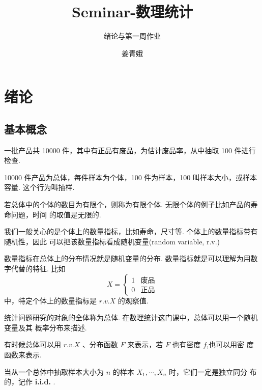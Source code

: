 \documentclass[openany]{book}
\title{Seminar-数理统计}
\subtitle{绪论与第一周作业}
\author{姜青娥}
\begin{document}
\maketitle

    \tableofcontents

\mainmatter
\chapter{绪论}

\section{基本概念}
\begin{example}
  一批产品共 10000 件，其中有正品有废品，为估计废品率，从中抽取 100 件进行检查.

  10000 件产品为总体，每件样本为个体，100 件为样本，100 叫样本大小，或样本容量.
  这个行为叫抽样.
\end{example}

若总体中的个体的数目为有限个，则称为有限个体. 无限个体的例子比如产品的寿命问题，时间
的取值是无限的.

我们一般关心的是个体上的数量指标，比如寿命，尺寸等. 个体上的数量指标带有随机性，因此
可以把该数量指标看成随机变量(random variable, r.v.)

数量指标在总体上的分布情况就是随机变量的分布.
数量指标就是可以理解为用数字代替的特征. 比如
\begin{equation}\label{1}
  X=\begin{cases}
    1& \text{废品} \\
    0& \text{正品}
  \end{cases}
\end{equation}
中，特定个体上的数量指标是 $r.v. X$ 的观察值.
\begin{definition}
  统计问题研究的对象的全体称为总体. 在数理统计这门课中，总体可以用一个随机变量及其
  概率分布来描述.
\end{definition}
有时候总体可以用 $r.v. X$ 、分布函数 $F$ 来表示，若 $F$ 也有密度 $f$,也可以用密
度函数来表示.

当从一个总体中抽取样本大小为 $n$ 的样本 $X_1,\cdots,X_n$ 时，它们一定是独立同分
布的，记作 {\bfseries i.i.d.} .
\end{document}
